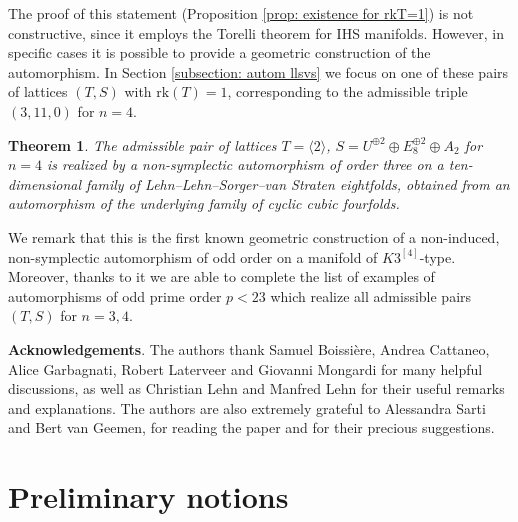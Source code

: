 \documentclass{amsart}
\newtheorem{theorem}{Theorem}[section]
\theoremstyle{definition}
\newcommand{\rk}{\mathrm{rk}}
\newcommand{\hskq}{K3^{\left[4\right]}}
\begin{document}
The proof of this statement (Proposition \ref{prop: existence for rkT=1}) is not constructive, since it employs the Torelli theorem for IHS manifolds. However, in specific cases it is possible to provide a geometric construction of the automorphism. In Section \ref{subsection: autom llsvs} we focus on one of these pairs of lattices $(T,S)$ with $\rk(T) = 1$, corresponding to the admissible triple $(3,11,0)$ for $n=4$.

\begin{theorem}
The admissible pair of lattices $T = \langle 2 \rangle$, $S = U^{\oplus 2} \oplus E_8^{\oplus 2} \oplus A_2$ for $n=4$ is realized by a non-symplectic automorphism of order three on a ten-dimensional family of Lehn--Lehn--Sorger--van Straten eightfolds, obtained from an automorphism of the underlying family of cyclic cubic fourfolds.
\end{theorem}

We remark that this is the first known geometric construction of a non-induced, non-symplectic automorphism of odd order on a manifold of $\hskq$-type. Moreover, thanks to it we are able to complete the list of examples of automorphisms of odd prime order $p < 23$ which realize all admissible pairs $(T,S)$ for $n=3,4$.

\medskip
\textbf{Acknowledgements}. The authors thank Samuel Boissi\`ere, Andrea Cattaneo, Alice Garbagnati, Robert Laterveer and Giovanni Mongardi for many helpful discussions, as well as Christian Lehn and Manfred Lehn for their useful remarks and explanations. The authors are also extremely grateful to Alessandra Sarti and Bert van Geemen, for reading the paper and for their precious suggestions. 


\section{Preliminary notions} \label{section: preliminaries}
\end{document}
